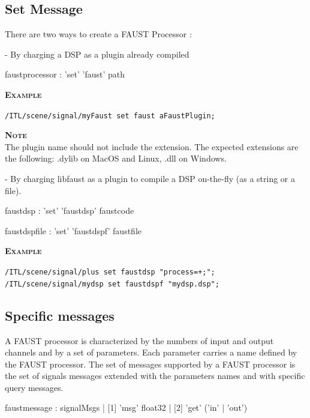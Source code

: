 \documentclass[a4paper,twoside]{report}
\newcommand{\subsublevel}[1]	{\subsection{#1}}
\newcommand{\example}		{\textbf{\hspace{-1.5cm}\textbf{\textsc{Example }}}}
\newcommand{\note}	[1]		{\vspace{2mm}\textbf{\hspace{-1.03cm}\textbf{\textsc{Note #1}}}}
\let\olditemize\itemize
\let\oldenditemize\enditemize
\renewenvironment{itemize} 	{\olditemize \setlength{\itemsep}{1mm}}{\oldenditemize}
\newcommand{\sample}	[1]			{\vspace{-2mm}\begin{center}\colorbox{mygrey}{
								\begin{minipage}[t]{0.9\columnwidth} 
								{\small \texttt{#1}}
								\end{minipage}}\end{center}}
\begin{document}
\subsublevel{Set Message}

There are two ways to create a FAUST Processor : 
\begin{itemize}
\item [1]- By charging a DSP as a plugin already compiled \\

\begin{rail}
faustprocessor : 'set' 'faust' path
\end{rail}

\example \\
\sample{/ITL/scene/signal/myFaust set faust aFaustPlugin;}

\note{} \\
The plugin name should not include the extension. The expected extensions are the following: .dylib on MacOS and Linux, .dll on Windows. \\

\item [2]- By charging libfaust as a plugin to compile a DSP on-the-fly  (as a string or a file). \\
\begin{rail}
faustdsp : 'set' 'faustdsp' faustcode
\end{rail}

\vspace{0.3cm}

\begin{rail}
faustdspfile : 'set' 'faustdspf' faustfile
\end{rail}

\example \\
\sample{/ITL/scene/signal/plus set faustdsp "process=+;"; \\
/ITL/scene/signal/mydsp set faustdspf "mydsp.dsp";
}

\end{itemize}

\subsublevel{Specific messages}
\label{faustmsg}
A FAUST processor is characterized by the numbers of input and output channels and by a set of parameters. Each parameter carries a name defined by the FAUST processor. The set of messages supported by a FAUST processor is the set of signals messages extended with the parameters names and with specific query messages. 

\begin{rail}
faustmessage : signalMsgs
			 | [1] 'msg' float32
			 | [2] 'get' ('in' | 'out')
\end{rail}
\end{document}
